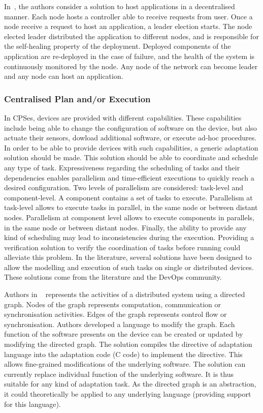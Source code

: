 \documentclass{article}
\begin{document}
In~\cite{jimenez_docma_2019}, the authors consider a solution to host applications in a decentralised manner. Each node hosts a controller able to receive requests from user. Once a node receive a request to host an application, a leader election starts. The node elected leader distributed the application to different nodes, and is responsible for the self-healing property of the deployment. Deployed components of the application are re-deployed in the case of failure, and the health of the system is continuously monitored by the node. Any node of the network can become leader and any node can host an application. 

\subsubsection{Centralised Plan and/or Execution}

In CPSes, devices are provided with different capabilities. These capabilities include being able to change the configuration of software on the device, but also actuate their sensors, dowload additional software, or execute ad-hoc procedures. In order to be able to provide devices with such capabilities, a generic adaptation solution should be made. This solution should be able to coordinate and schedule any type of task. Expressiveness regarding the scheduling of tasks and their dependencies enables parallelism and time-efficient executions to quickly reach a desired configuration. Two levels of parallelism are considered: task-level and component-level. A component contains a set of tasks to execute. Parallelism at task-level allows to execute tasks in parallel, in the same node or between distant nodes. Parallelism at component level allows to execute components in parallels, in the same node or between distant nodes. Finally, the ability to provide any kind of scheduling may lead to inconsistencies during the execution. Providing a verification solution to verify the coordination of tasks before running could alleviate this problem. In the literature, several solutions have been designed to allow the modelling and execution of such tasks on single or distributed devices. These solutions come from the literature and the DevOps community.

Authors in ~\cite{stg_coordinating_2004} represents the activities of a distributed system using a directed graph. Nodes of the graph represents computation, communication or synchronisation activities. Edges of the graph represents control flow or synchronisation. Authors developed a language to modify the graph. Each function of the software presents on the device can be created or updated by modifying the directed graph. The solution compiles the directive of adaptation language into the adaptation code (\ie C code) to implement the directive. This allows fine-grained modifications of the underlying software. The solution can currently replace individual function of the underlying software. It is thus suitable for any kind of adaptation task. As the directed graph is an abstraction, it could theoretically be applied to any underlying language (providing support for this language).
\end{document}
